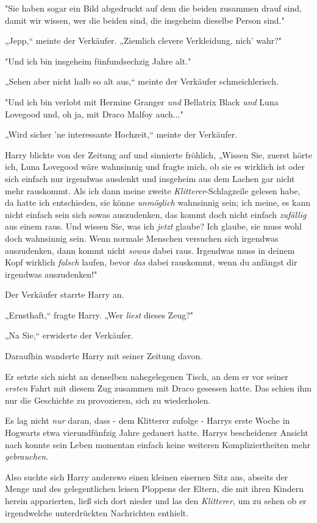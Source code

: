 {"Sie haben sogar ein Bild abgedruckt auf dem die beiden zusammen drauf sind, damit wir wissen, wer die beiden sind, die insgeheim dieselbe Person sind."

„Jepp,“ meinte der Verkäufer. „Ziemlich clevere Verkleidung, nich' wahr?"

"Und ich bin insgeheim fünfundsechzig Jahre alt."

„Sehen aber nicht halb so alt aus,“ meinte der Verkäufer schmeichlerisch.

"Und ich bin verlobt mit Hermine Granger \emph{und} Bellatrix Black \emph{und} Luna Lovegood und, oh ja, mit Draco Malfoy auch..."

„Wird sicher 'ne interessante Hochzeit,“ meinte der Verkäufer.

Harry blickte von der Zeitung auf und sinnierte fröhlich, „Wissen Sie, zuerst hörte ich, Luna Lovegood wäre wahnsinnig und fragte mich, ob sie es wirklich ist oder sich einfach nur irgendwas ausdenkt und insgeheim aus dem Lachen gar nicht mehr rauskommt. Als ich dann meine zweite \emph{Klitterer}-Schlagzeile gelesen habe, da hatte ich entschieden, sie könne \emph{unmöglich} wahnsinnig sein; ich meine, es kann nicht einfach sein sich sowas auszudenken, das kommt doch nicht einfach \emph{zufällig} aus einem raus. Und wissen Sie, was ich \emph{jetzt} glaube? Ich glaube, sie muss wohl doch wahnsinnig sein. Wenn normale Menschen versuchen sich irgendwas auszudenken, dann kommt nicht \emph{sowas} dabei raus. Irgendwas muss in deinem Kopf wirklich \emph{falsch} laufen, bevor \emph{das} dabei rauskommt, wenn du anfängst dir irgendwas auszudenken!"

Der Verkäufer starrte Harry an.

„Ernsthaft,“ fragte Harry. „Wer \emph{liest} dieses Zeug?"

„Na Sie,“ erwiderte der Verkäufer.

Daraufhin wanderte Harry mit seiner Zeitung davon.

Er setzte sich nicht an denselben nahegelegenen Tisch, an dem er vor seiner \emph{ersten} Fahrt mit diesem Zug zusammen mit Draco gesessen hatte. Das schien ihm nur die Geschichte zu provozieren, sich zu wiederholen.

Es lag nicht \emph{nur} daran, dass - dem Klitterer zufolge - Harrys erste Woche in Hogwarts etwa vierundfünfzig Jahre gedauert hatte. Harrys bescheidener Ansicht nach konnte sein Leben momentan einfach keine weiteren Kompliziertheiten mehr \emph{gebrauchen}.

Also suchte sich Harry anderswo einen kleinen eisernen Sitz aus, abseits der Menge und des gelegentlichen leisen Ploppens der Eltern, die mit ihren Kindern herein apparierten, ließ sich dort nieder und las den \emph{Klitterer}, um zu sehen ob er irgendwelche unterdrückten Nachrichten enthielt.

}
